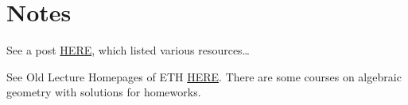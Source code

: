\section{Notes}

See a post \href{https://math.stackexchange.com/questions/1678780/hartshorne-or-vakils-notes}{HERE}, which listed various resources\dots

See Old Lecture Homepages of ETH \href{https://www2.math.ethz.ch/education/bachelor/lectures.html}{HERE}. There are some courses on algebraic geometry with solutions for homeworks.